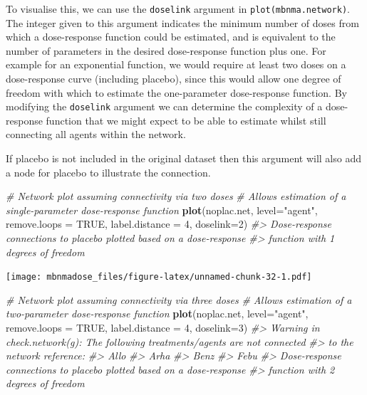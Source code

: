 \documentclass[]{article}
\newenvironment{Shaded}{\begin{snugshade}}{\end{snugshade}}
\newcommand{\CommentTok}[1]{\textcolor[rgb]{0.56,0.35,0.01}{\textit{#1}}}
\newcommand{\DataTypeTok}[1]{\textcolor[rgb]{0.13,0.29,0.53}{#1}}
\newcommand{\DecValTok}[1]{\textcolor[rgb]{0.00,0.00,0.81}{#1}}
\newcommand{\KeywordTok}[1]{\textcolor[rgb]{0.13,0.29,0.53}{\textbf{#1}}}
\newcommand{\NormalTok}[1]{#1}
\newcommand{\OtherTok}[1]{\textcolor[rgb]{0.56,0.35,0.01}{#1}}
\newcommand{\StringTok}[1]{\textcolor[rgb]{0.31,0.60,0.02}{#1}}
\begin{document}
To visualise this, we can use the \texttt{doselink} argument in
\texttt{plot(mbnma.network)}. The integer given to this argument
indicates the minimum number of doses from which a dose-response
function could be estimated, and is equivalent to the number of
parameters in the desired dose-response function plus one. For example
for an exponential function, we would require at least two doses on a
dose-response curve (including placebo), since this would allow one
degree of freedom with which to estimate the one-parameter dose-response
function. By modifying the \texttt{doselink} argument we can determine
the complexity of a dose-response function that we might expect to be
able to estimate whilst still connecting all agents within the network.

If placebo is not included in the original dataset then this argument
will also add a node for placebo to illustrate the connection.

\begin{Shaded}
\begin{Highlighting}[]
\CommentTok{# Network plot assuming connectivity via two doses}
\CommentTok{# Allows estimation of a single-parameter dose-response function}
\KeywordTok{plot}\NormalTok{(noplac.net, }\DataTypeTok{level=}\StringTok{"agent"}\NormalTok{, }\DataTypeTok{remove.loops =} \OtherTok{TRUE}\NormalTok{, }\DataTypeTok{label.distance =} \DecValTok{4}\NormalTok{,}
     \DataTypeTok{doselink=}\DecValTok{2}\NormalTok{)}
\CommentTok{#> Dose-response connections to placebo plotted based on a dose-response}
\CommentTok{#>                    function with 1 degrees of freedom}
\end{Highlighting}
\end{Shaded}

\texttt{[image: mbnmadose\_files/figure-latex/unnamed-chunk-32-1.pdf]}

\begin{Shaded}
\begin{Highlighting}[]

\CommentTok{# Network plot assuming connectivity via three doses}
\CommentTok{# Allows estimation of a two-parameter dose-response function}
\KeywordTok{plot}\NormalTok{(noplac.net, }\DataTypeTok{level=}\StringTok{"agent"}\NormalTok{, }\DataTypeTok{remove.loops =} \OtherTok{TRUE}\NormalTok{, }\DataTypeTok{label.distance =} \DecValTok{4}\NormalTok{,}
     \DataTypeTok{doselink=}\DecValTok{3}\NormalTok{)}
\CommentTok{#> Warning in check.network(g): The following treatments/agents are not connected}
\CommentTok{#> to the network reference:}
\CommentTok{#> Allo}
\CommentTok{#> Arha}
\CommentTok{#> Benz}
\CommentTok{#> Febu}
\CommentTok{#> Dose-response connections to placebo plotted based on a dose-response}
\CommentTok{#>                    function with 2 degrees of freedom}
\end{Highlighting}
\end{Shaded}
\end{document}
